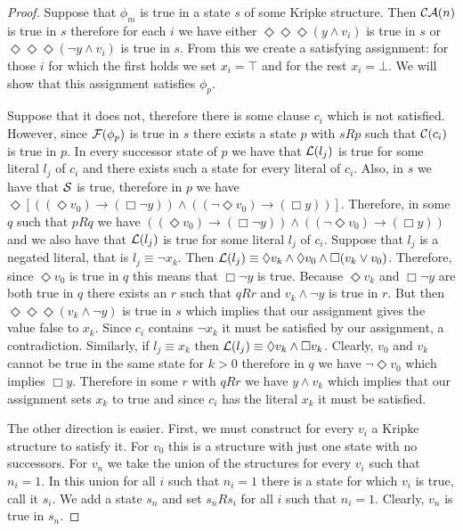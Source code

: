 \documentclass{llncs}
\begin{document}
\begin{proof}

Suppose that $\phi_m$ is true in a state $s$ of some Kripke structure.  Then
$\mathcal{CA}(n)$ is true in $s$ therefore for each $i$ we have either
$\Diamond\Diamond\Diamond (y\land v_i)$ is true in $s$ or
$\Diamond\Diamond\Diamond (\neg y\land v_i)$ is true in $s$. From this we
create a satisfying assignment: for those $i$ for which the first holds we set
$x_i=\top$ and for the rest $x_i=\bot$. We will show that this assignment
satisfies $\phi_p$.

Suppose that it does not, therefore there is some clause $c_i$ which is not
satisfied. However, since $\mathcal{F}(\phi_p)$ is true in $s$ there exists a state $p$
with $sRp$ such that $\mathcal{C}(c_i)$ is true in $p$. In every successor state of $p$
we have that $\mathcal{L}(l_j)$ is true for some literal $l_j$ of $c_i$ and there
exists such a state for every literal of $c_i$. Also, in $s$ we have that
$\mathcal{S}$ is true, therefore in $p$ we have $\Diamond \left[ \left((\Diamond v_0)
\to (\Box \neg y)\right) \land \left( (\neg \Diamond v_0)\to (\Box y) \right)
\right]$. Therefore, in some $q$ such that $pRq$ we have $\left((\Diamond v_0)
\to (\Box \neg y)\right) \land \left( (\neg \Diamond v_0)\to (\Box y) \right)$
and we also have that $\mathcal{L}(l_j)$ is true for some literal $l_j$ of $c_i$.
Suppose that $l_j$ is a negated literal, that is $l_j\equiv \neg x_k$. Then
$\mathcal{L}(l_j) \equiv \Diamond v_k \land \Diamond v_0 \land \Box (v_k \lor v_0)$.
Therefore, since $\Diamond v_0$ is true in $q$ this means that $\Box \neg y$ is
true. Because $\Diamond v_k$ and $\Box \neg y$ are both true in $q$ there
exists an $r$ such that $qRr$ and $v_k\land \neg y$ is true in $r$. But then
$\Diamond\Diamond\Diamond (v_k\land \neg y)$ is true in $s$ which implies that
our assignment gives the value false to $x_k$. Since $c_i$ contains $\neg x_k$
it must be satisfied by our assignment, a contradiction. Similarly, if
$l_j\equiv x_k$ then $\mathcal{L}(l_j)\equiv \Diamond v_k \land \Box v_k$. Clearly,
$v_0$ and $v_k$ cannot be true in the same state for $k>0$ therefore in $q$ we
have $\neg \Diamond v_0$ which implies $\Box y$. Therefore in some $r$ with
$qRr$ we have $y\land v_k$ which implies that our assignment sets $x_k$ to true
and since $c_i$ has the literal $x_k$ it must be satisfied.

The other direction is easier. First, we must construct for every $v_i$ a
Kripke structure to satisfy it. For $v_0$ this is a structure with just one
state with no successors. For $v_n$ we take the union of the structures for
every $v_i$ such that $n_i=1$. In this union for all $i$ such that $n_i=1$
there is a state for which $v_i$ is true, call it $s_i$. We add a state $s_n$
and set $s_nRs_i$ for all $i$ such that $n_i=1$. Clearly, $v_n$ is true in
$s_n$.


\end{proof}
\end{document}
